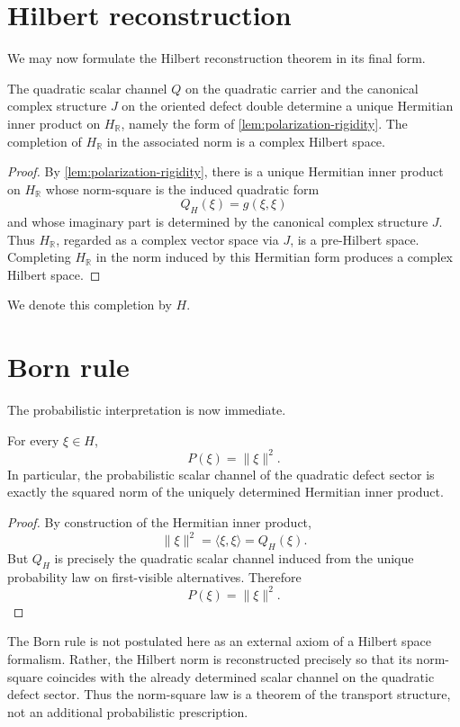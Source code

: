 \section{Hilbert reconstruction}
\label{sec:hilbert-reconstruction}
We may now formulate the Hilbert reconstruction theorem in its final
form.
\begin{theorem}
	The quadratic scalar channel \(Q\) on the quadratic carrier and the
	canonical complex structure \(J\) on the oriented defect double
	determine a unique Hermitian inner product on \(H_{\mathbb R}\), namely
	the form of \cref{lem:polarization-rigidity}.
	The completion of \(H_{\mathbb R}\) in the associated norm is a complex
	Hilbert space.
\end{theorem}
\begin{proof}
	By \cref{lem:polarization-rigidity}, there is a unique Hermitian inner
	product on \(H_{\mathbb R}\) whose norm-square is the induced quadratic
	form
	\[
		Q_H(\xi)=g(\xi,\xi)
	\]
	and whose imaginary part is determined by the canonical complex
	structure \(J\).
	Thus \(H_{\mathbb R}\), regarded as a complex vector space via \(J\), is
	a pre-Hilbert space.
	Completing \(H_{\mathbb R}\) in the norm induced by this Hermitian form
	produces a complex Hilbert space.
\end{proof}
We denote this completion by \(H\).
\section{Born rule}
\label{sec:hilbert-born}
The probabilistic interpretation is now immediate.
\begin{corollary}
	For every \(\xi\in H\),
	\[
		P(\xi)=\|\xi\|^{2}.
	\]
	In particular, the probabilistic scalar channel of the quadratic defect
	sector is exactly the squared norm of the uniquely determined Hermitian
	inner product.
\end{corollary}
\begin{proof}
	By construction of the Hermitian inner product,
	\[
		\|\xi\|^{2}
		=
		\langle \xi,\xi\rangle
		=
		Q_H(\xi).
	\]
	But \(Q_H\) is precisely the quadratic scalar channel induced from the
	unique probability law on first-visible alternatives.
	Therefore
	\[
		P(\xi)=\|\xi\|^{2}.
	\]
\end{proof}
\begin{remark}
	The Born rule is not postulated here as an external axiom of a Hilbert
	space formalism.
	Rather, the Hilbert norm is reconstructed precisely so that its
	norm-square coincides with the already determined scalar channel on the
	quadratic defect sector.
	Thus the norm-square law is a theorem of the transport structure, not an
	additional probabilistic prescription.
\end{remark}
